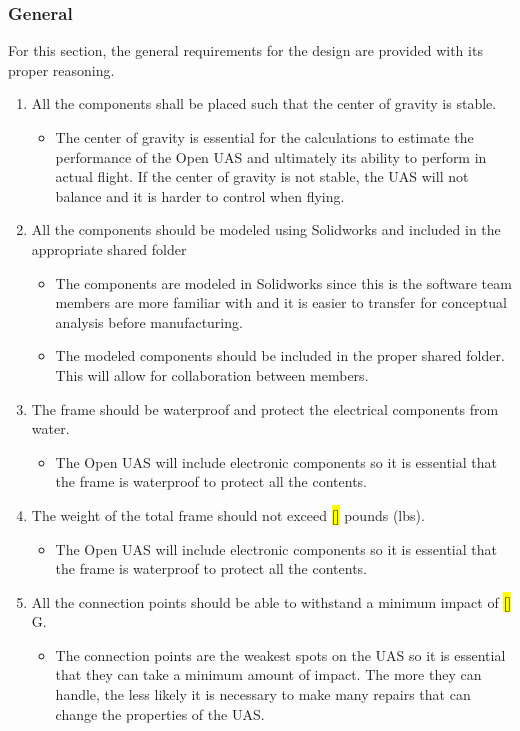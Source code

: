 \documentclass{article}
\begin{document}
\subsubsection{General}
For this section, the general requirements for the design are provided with its proper reasoning.
\begin{enumerate}
  \item{All the components shall be placed such that the center of gravity is stable.}
  \begin{itemize}
    \item{The center of gravity is essential for the calculations to estimate the performance of the Open UAS and ultimately its ability to perform in actual flight. If the center of gravity is not stable, the UAS will not balance and it is harder to control when flying.}
  \end{itemize}
  
  \item{All the components should be modeled using Solidworks and included in the appropriate shared folder}
  \begin{itemize}
    \item{The components are modeled in Solidworks since this is the software team members are more familiar with and it is easier to transfer for conceptual analysis before manufacturing.}
    \item{The modeled components should be included in the proper shared folder. This will allow for collaboration between members.}
  \end{itemize}
  
  \item{The frame should be waterproof and protect the electrical components from water.}
  \begin{itemize}
    \item{The Open UAS will include electronic components so it is essential that the frame is waterproof to protect all the contents.}
  \end{itemize}
  
  \item{The weight of the total frame should not exceed \hl{[]} pounds (lbs).}
  \begin{itemize}
    \item{The Open UAS will include electronic components so it is essential that the frame is waterproof to protect all the contents.}
  \end{itemize}
  
  \item{All the connection points should be able to withstand a minimum impact of \hl{[]} G.}
  \begin{itemize}
    \item{The connection points are the weakest spots on the UAS so it is essential that they can take a minimum amount of impact. The more they can handle, the less likely it is necessary to make many repairs that can change the properties of the UAS.}
  \end{itemize}
  

\end{enumerate}
\end{document}
